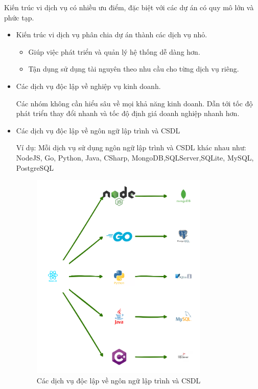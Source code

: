 Kiến trúc vi dịch vụ có nhiều ưu điểm, đặc biệt với các dự án có quy mô lớn và phức tạp.

\begin{itemize}

    \item Kiến trúc vi dịch vụ phân chia dự án thành các dịch vụ nhỏ.

          \begin{itemize}

              \item Giúp việc phát triển và quản lý hệ thống dễ dàng hơn.

              \item Tận dụng sử dụng tài nguyên theo nhu cầu cho từng dịch vụ riêng.

          \end{itemize}

    \item Các dịch vụ độc lập về nghiệp vụ kinh doanh.

          Các nhóm không cần hiểu sâu về mọi khả năng kinh doanh. Dẫn tới tốc độ phát triển thay đổi nhanh và tốc độ định giá doanh nghiệp nhanh hơn.

    \item Các dịch vụ độc lập về ngôn ngữ lập trình và CSDL



          Ví dụ: Mỗi dịch vụ sử dụng ngôn ngữ lập trình và CSDL  khác  nhau như: NodeJS, Go, Python, Java, CSharp,        MongoDB,SQLServer,SQLite, MySQL,  PostgreSQL
          \begin{figure}[h]
              \centering
              \includegraphics[height=10cm]{pictures/DaNgonNguVaCSDL/main.drawio.png}
              \caption{Các dịch vụ độc lập về ngôn ngữ lập trình và CSDL}
          \end{figure}










\end{itemize}
